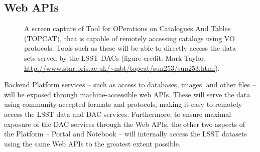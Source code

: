 \subsection{Web APIs\label{sec:apis}}

\begin{figure}
	\centering
	\caption{A screen capture of Tool for OPerations on Catalogues And Tables (TOPCAT), that is capable of remotely accessing catalogs using VO protocols. Tools such as these will be able to directly access the data sets served by the LSST DACs (figure credit: Mark Taylor, \url{http://www.star.bris.ac.uk/~mbt/topcat/sun253/sun253.html}).
		\label{fig:toolsTOPCAT}}
\end{figure}

Backend Platform services -- such as access to
databases, images, and other files -- will be exposed through
machine-accessible web APIs.
 These will serve the data using community-accepted formats and protocols, making it easy to remotely access the LSST data and DAC services. 
Furthermore, to ensure maximal exposure of the DAC services through the Web APIs, the other two aspects of the Platform -- Portal and Notebook -- will
internally access the LSST datasets using the same Web APIs to the greatest extent possible.

